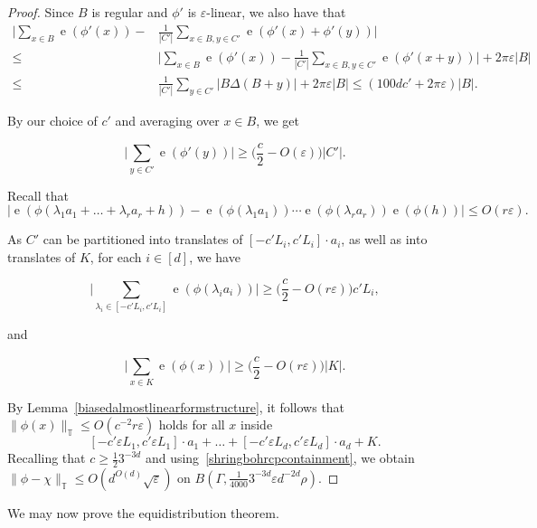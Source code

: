 \documentclass[a4paper,11pt]{article}
\numberwithin{theorem}{section}
\theoremstyle{definition}
\newcommand{\on}[1]{
	\operatorname{#1}
}
\begin{document}
\begin{proof}
    Since $B$ is regular and $\phi'$ is $\varepsilon$-linear, we also have that 
    \begin{align*}\Big|\sum_{x \in B} \on{e}(\phi'(x)) - &\frac{1}{|C'|}\sum_{x \in B, y \in C'} \on{e}(\phi'(x) + \phi'(y))\Big| \\
    \leq &\Big|\sum_{x \in B} \on{e}(\phi'(x)) - \frac{1}{|C'|}\sum_{x \in B, y \in C'} \on{e}(\phi'(x + y))\Big| + 2 \pi \varepsilon |B|\\
    \leq & \frac{1}{|C'|}\sum_{y \in C'} |B \Delta (B + y)| + 2 \pi \varepsilon |B|  \leq (100d c' + 2 \pi \varepsilon) |B|. \end{align*}

    By our choice of $c'$ and averaging over $x \in B$, we get

    \[\Big|\sum_{y \in C'} \on{e}(\phi'(y))\Big| \geq \Big(\frac{c}{2} - O(\varepsilon)\Big) |C'|.\]

    Recall that 
    \[\Big|\on{e}(\phi(\lambda_1 a_1 + \dots + \lambda_r a_r + h)) - \on{e}(\phi(\lambda_1 a_1)) \cdots \on{e}(\phi(\lambda_r a_r))\on{e}(\phi(h))\Big| \leq O(r \varepsilon).\]
    
    As $C'$ can be partitioned into translates of $[- c' L_i, c' L_i] \cdot a_i$, as well as into translates of $K$, for each $i \in [d]$, we have
    
    \[\Big|\sum_{\lambda_i \in [- c'L_i, c' L_i]} \on{e}(\phi(\lambda_i a_i))\Big| \geq \Big(\frac{c}{2} - O(r\varepsilon)\Big) c'L_i,\]

    and 

    \[\Big|\sum_{x\in K} \on{e}(\phi(x))\Big| \geq \Big(\frac{c}{2} - O(r\varepsilon)\Big) |K|.\]

    By Lemma~\ref{biasedalmostlinearformstructure}, it follows that $\|\phi(x)\|_{\mathbb{T}} \leq O(c^{-2}r\varepsilon)$ holds for all $x$ inside
    \[[- c'\varepsilon L_1, c'\varepsilon L_1] \cdot a_1 + \dots + [-c'\varepsilon L_d,c'\varepsilon L_d] \cdot a_d + K.\]
    Recalling that $c \geq \frac{1}{2}3^{-3d}$ and using~\eqref{shringbohrcpcontainment}, we obtain $\|\phi - \chi\|_{\mathbb{T}} \leq O(d^{O(d)}\sqrt{\varepsilon})$ on $B(\Gamma, \frac{1}{4000}3^{-3d} \varepsilon d^{-2d}\rho)$.
\end{proof}

\vspace{\baselineskip}

We may now prove the equidistribution theorem.

\vspace{\baselineskip}
\end{document}
